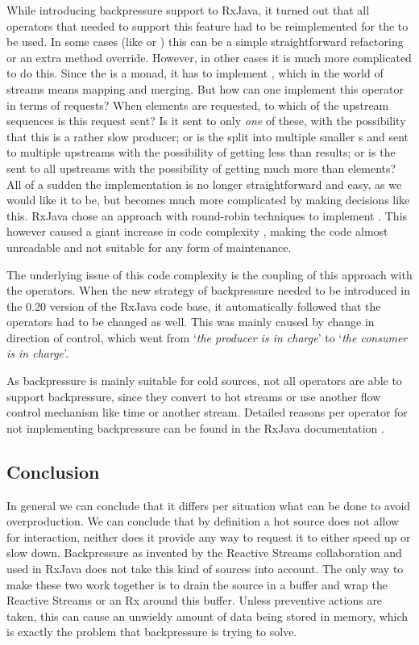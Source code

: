 While introducing backpressure support to RxJava, it turned out that all operators that needed to support this feature had to be reimplemented for the  to be used. In some cases (like  or ) this can be a simple straightforward refactoring or an extra method override. However, in other cases it is much more complicated to do this. Since the \obs is a monad, it has to implement , which in the world of streams means mapping and merging. But how can one implement this  operator in terms of requests? When  elements are requested, to which of the  upstream \obs sequences is this request sent? Is it sent to only \emph{one} of these, with the possibility that this is a rather slow producer; or is the  split into multiple smaller s and sent to multiple upstreams with the possibility of getting less than  results; or is the  sent to all upstreams with the possibility of getting much more than  elements? All of a sudden the implementation is no longer straightforward and easy, as we would like it to be, but becomes much more complicated by making decisions like this. RxJava chose an approach with round-robin techniques to implement . This however caused a giant increase in code complexity \cite{RxJava-source-code}, making the code almost unreadable and not suitable for any form of maintenance.

The underlying issue of this code complexity is the coupling of this approach with the operators. When the new strategy of backpressure needed to be introduced in the 0.20 version of the RxJava code base, it automatically followed that the operators had to be changed as well. This was mainly caused by change in direction of control, which went from `\textit{the producer is in charge}' to `\textit{the consumer is in charge}'.

As backpressure is mainly suitable for cold sources, not all operators are able to support backpressure, since they convert to hot streams or use another flow control mechanism like time or another stream. Detailed reasons per operator for not implementing backpressure can be found in the RxJava documentation \cite{rx-api}.

\subsection{Conclusion}
In general we can conclude that it differs per situation what can be done to avoid overproduction. We can conclude that by definition a hot source does not allow for interaction, neither does it provide any way to request it to either speed up or slow down. Backpressure as invented by the Reactive Streams collaboration and used in RxJava does not take this kind of sources into account. The only way to make these two work together is to drain the source in a buffer and wrap the Reactive Streams  or an Rx \obs around this buffer. Unless preventive actions are taken, this can cause an unwieldy amount of data being stored in memory, which is exactly the problem that backpressure is trying to solve.

